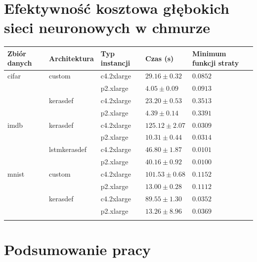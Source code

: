 \documentclass[12pt,a4paper,twoside]{article}
\begin{document}






\clearpage

\section{Efektywność kosztowa głębokich sieci neuronowych w chmurze}

\begin{tabular}{lllll}
\toprule
Zbiór danych & Architektura & Typ instancji & Czas (s) & Minimum funkcji straty \\
\midrule
cifar & custom & c4.2xlarge & $29.16\pm0.32$ & $0.0852$ \\
      & & p2.xlarge & $4.05\pm0.09$ & $0.0913$ \\
\midrule
      & kerasdef & c4.2xlarge & $23.20\pm0.53$ & $0.3513$ \\
      & & p2.xlarge & $4.39\pm0.14$ & $0.3391$ \\
\midrule
imdb & kerasdef & c4.2xlarge & $125.12\pm2.07$ & $0.0309$ \\
      & & p2.xlarge & $10.31\pm0.44$ & $0.0314$ \\
\midrule
      & lstmkerasdef & c4.2xlarge & $46.80\pm1.87$ & $0.0101$ \\
      & & p2.xlarge & $40.16\pm0.92$ & $0.0100$ \\
\midrule
mnist & custom & c4.2xlarge & $101.53\pm0.68$ & $0.1152$ \\
      & & p2.xlarge & $13.00\pm0.28$ & $0.1112$ \\
\midrule
      & kerasdef & c4.2xlarge & $89.55\pm1.30$ & $0.0352$ \\
      & & p2.xlarge & $13.26\pm8.96$ & $0.0369$ \\
\bottomrule
\label{tab:experiment_results}
\end{tabular}

\clearpage

\section{Podsumowanie pracy}
\end{document}
